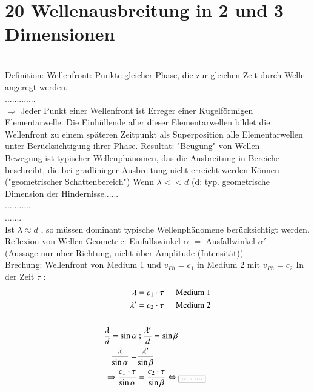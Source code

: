 \section{20 Wellenausbreitung in 2 und 3 Dimensionen} \hfill\\
Definition: Wellenfront: Punkte gleicher Phase, die zur gleichen Zeit durch Welle angeregt werden. \\
.............\\
$ \Rightarrow $ Jeder Punkt einer Wellenfront ist Erreger einer Kugelförmigen Elementarwelle. Die Einhüllende aller dieser Elementarwellen bildet die Wellenfront zu einem späteren Zeitpunkt als Superposition alle Elementarwellen unter Berücksichtigung ihrer Phase.
\bild
\bild
Resultat: "Beugung" von Wellen \\
Bewegung ist typischer Wellenphänomen, das die Ausbreitung in Bereiche beschreibt, die bei gradlinieger Ausbreitung nicht erreicht werden Können ("geometrischer Schattenbereich")
\bild
Wenn $ \lambda << d $ (d: typ. geometrische Dimension der Hindernisse......\\
...........\\
.......\\
Ist $ \lambda \approx d$ , so müssen dominant typische Wellenphänomene berücksichtigt werden.\\
Reflexion von Wellen
\bild
{}
Geometrie: Einfallswinkel $ \alpha $ $ = $ Ausfallwinkel $ \alpha' $\\
(Aussage nur über Richtung, nicht über Amplitude (Intensität))\\
Brechung: Wellenfront von Medium 1 und $ v_{Ph} = c_1 $ in Medium 2 mit $ v_{Ph} = c_2 $
\bild
In der Zeit $ \tau $ : \begin{align*}
\lambda &= c_1 \cdot \tau \hspace{5mm} \text{Medium 1}\\
\lambda' &= c_2 \cdot \tau \hspace{5mm} \text{Medium 2}\\
\hfill\\
\frac{\lambda}{d} = \sin\alpha& \text{ ; } \frac{\lambda'}{d} = \sin\beta\\
\frac{\lambda}{\sin\alpha} =& \frac{\lambda'}{\sin\beta}\\
\Rightarrow \frac{c_1 \cdot \tau}{\sin\alpha} &= \frac{c_2 \cdot \tau}{\sin\beta} \Leftrightarrow \boxed{..........}
\end{align*}
